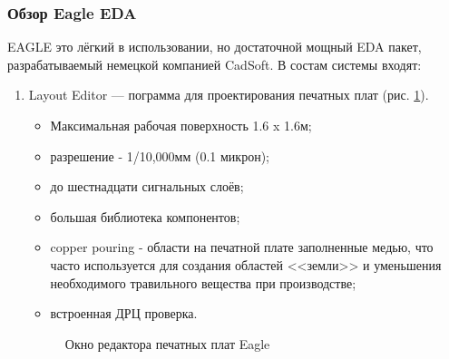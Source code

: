 \subsubsection{Обзор Eagle EDA}
\begin{par}
EAGLE это лёгкий в использовании, но достаточной мощный EDA пакет, разрабатываемый немецкой компанией CadSoft.
В состам системы входят:
\begin{enumerate}
	\item{}Layout Editor --- пограмма для проектирования печатных плат (рис. \ref{img:eagle_brd}). 
		\begin{itemize}
			\item{}Максимальная рабочая поверхность 1.6 x 1.6м;
			\item{}разрешение - 1/10,000мм (0.1 микрон);
			\item{}до шестнадцати сигнальных слоёв;
			\item{}большая библиотека компонентов;
			\item{}copper pouring - области на печатной плате заполненные  медью, что часто используется для создания областей <<земли>> и уменьшения необходимого травильного вещества при производстве;
			\item{}встроенная ДРЦ проверка.
		\end{itemize}
        \begin{figure}[ht]
            \caption{Окно редактора печатных плат Eagle}
            \label{img:eagle_brd}
        \end{figure}


\end{enumerate}
\end{par}
